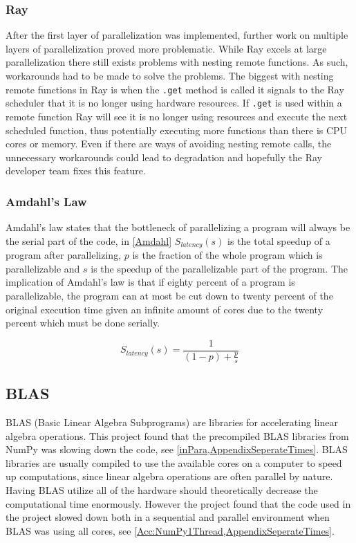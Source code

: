 \documentclass[12pt, a4paper]{article}
\begin{document}
\subsubsection{Ray}\label{RayNesting}

After the first layer of parallelization was implemented, further work on multiple layers of parallelization proved more problematic.
While Ray excels at large parallelization there still exists problems with nesting remote functions. As such, workarounds had to be made to solve the problems.
The biggest with nesting remote functions in Ray is when the \texttt{.get} method is called it signals to the Ray scheduler that it is no longer using hardware resources.
If \texttt{.get} is used within a remote function Ray will see it is no longer using resources and execute the next scheduled function, thus potentially executing more functions than there is CPU cores or memory.
Even if there are ways of avoiding nesting remote calls, the unnecessary workarounds could lead to degradation and hopefully the Ray developer team fixes this feature. 

\subsubsection{Amdahl's Law}

Amdahl's law states that the bottleneck of parallelizing a program will always be the serial part of the code, in \cref{Amdahl} $S_{latency}(s)$ is the total speedup of a program after parallelizing, $p$ is the fraction of the whole program which is parallelizable and $s$ is the speedup of the parallelizable part of the program.
The implication of Amdahl's law is that if eighty percent of a program is parallelizable, the program can at most be cut down to twenty percent of the original execution time given an infinite amount of cores due to the twenty percent which must be done serially.

\begin{equation}\label{Amdahl}
    S_{latency}(s) = \frac{1}{(1-p) + \frac{p}{s}}
\end{equation}

\subsection{BLAS}

BLAS (Basic Linear Algebra Subprograms) are libraries for accelerating linear algebra operations.
This project found that the precompiled BLAS libraries from NumPy was slowing down the code, see \cref{inPara,AppendixSeperateTimes}.
BLAS libraries are usually compiled to use the available cores on a computer to speed up computations, since linear algebra operations are often parallel by nature.
Having BLAS utilize all of the hardware should theoretically decrease the computational time enormously.
However the project found that the code used in the project slowed down both in a sequential and parallel environment when BLAS was using all cores, see \cref{Acc:NumPy1Thread,AppendixSeperateTimes}.
\end{document}
